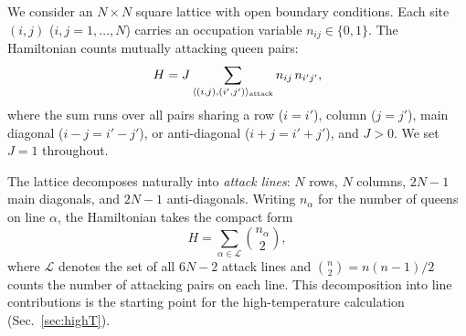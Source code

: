 \documentclass[aps, pre, reprint, amsmath, amssymb, superscriptaddress, floatfix]{revtex4-2}
\begin{document}
We consider an $N \times N$ square lattice with open boundary
conditions.  Each site $(i,j)$ ($i,j = 1,\ldots,N$) carries an
occupation variable $n_{ij} \in \{0,1\}$.  The Hamiltonian counts
mutually attacking queen pairs:
\begin{equation}
  H = J \sum_{\langle (i,j),(i',j') \rangle_{\rm attack}}
  n_{ij}\, n_{i'j'},
  \label{eq:H}
\end{equation}
where the sum runs over all pairs sharing a row ($i = i'$), column
($j = j'$), main diagonal ($i - j = i' - j'$), or anti-diagonal
($i + j = i' + j'$), and $J > 0$.  We set $J = 1$ throughout.

The lattice decomposes naturally into \textit{attack lines}: $N$ rows,
$N$ columns, $2N-1$ main diagonals, and $2N-1$ anti-diagonals.
Writing $n_\alpha$ for the number of queens on line $\alpha$, the
Hamiltonian takes the compact form
\begin{equation}
  H = \sum_{\alpha \in \mathcal{L}} \binom{n_\alpha}{2},
  \label{eq:H_lines}
\end{equation}
where $\mathcal{L}$ denotes the set of all $6N - 2$ attack lines and
$\binom{n}{2} = n(n-1)/2$ counts the number of attacking pairs on
each line.  This decomposition into line contributions is the
starting point for the high-temperature calculation
(Sec.~\ref{sec:highT}).
\end{document}
